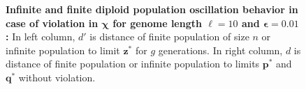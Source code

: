 \begin{figure}[h]
\begin{center}
\hspace{-3em}%
\vspace{-0.5em}  \hspace{-3em}%


\caption[\textbf{Infinite and finite diploid population oscillation behavior in case of violation in $\bm{\chi}$ for genome length $\ell = 10$ and $\bm{\epsilon} = 0.01$}]{\textbf{Infinite and finite diploid population oscillation behavior in case of violation in $\bm{\chi}$ for genome length $\ell = 10$ and $\bm{\epsilon} = 0.01$:} 
  In left column, $d'$ is distance of finite population of size $n$ or infinite population to limit $\bm{z}^\ast$ for $g$ generations. In right column, $d$ is distance of finite population or infinite population to limits $\bm{p}^\ast$ and $\bm{q}^\ast$ without violation.}
\label{oscillation_10d_vio_chi_0.01}
\end{center}
\end{figure}

